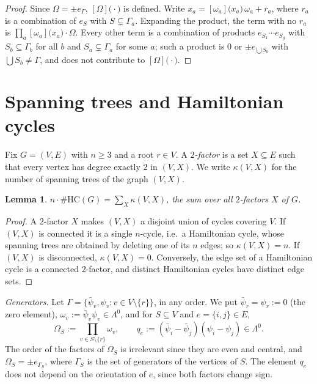 \documentclass[11pt]{amsart}
\theoremstyle{plain}
\newtheorem{lemma}[theorem]{Lemma}
\theoremstyle{definition}
\theoremstyle{remark}
\numberwithin{equation}{section}
\newcommand{\HC}{\#\mathrm{HC}}
\newcommand{\bpsi}{\bar\psi}
\newcommand{\topc}[2]{[#1]\bigl(#2\bigr)}
\begin{document}
\begin{proof}
Since $\Omega=\pm e_\Gamma$, $\topc{\Omega}{\cdot}$ is defined. Write
$x_a=\topc{\omega_a}{x_a}\,\omega_a+r_a$, where $r_a$ is a combination of $e_S$ with
$S\subsetneq\Gamma_a$. Expanding the product, the term with no $r_a$ is
$\prod_a\topc{\omega_a}{x_a}\cdot\Omega$. Every other term is a combination of products
$e_{S_1}\cdots e_{S_g}$ with $S_b\subseteq\Gamma_b$ for all $b$ and $S_a\subsetneq\Gamma_a$ for
some $a$; such a product is $0$ or $\pm e_{\bigcup S_b}$ with $\bigcup S_b\ne\Gamma$, and does not
contribute to $\topc{\Omega}{\cdot}$.
\end{proof}

\section{Spanning trees and Hamiltonian cycles}\label{sec:trees}

Fix $G=(V,E)$ with $n\ge3$ and a root $r\in V$. A \emph{$2$-factor} is a set $X\subseteq E$ such
that every vertex has degree exactly $2$ in $(V,X)$. We write $\kappa(V,X)$ for the number of
spanning trees of the graph $(V,X)$.

\begin{lemma}\label{lem:2factor-trees}
$n\cdot\HC(G)=\sum_{X}\kappa(V,X)$, the sum over all $2$-factors $X$ of $G$.
\end{lemma}

\begin{proof}
A $2$-factor $X$ makes $(V,X)$ a disjoint union of cycles covering $V$. If $(V,X)$ is connected
it is a single $n$-cycle, i.e.\ a Hamiltonian cycle, whose spanning trees are obtained by deleting
one of its $n$ edges; so $\kappa(V,X)=n$. If $(V,X)$ is disconnected, $\kappa(V,X)=0$. Conversely,
the edge set of a Hamiltonian cycle is a connected $2$-factor, and distinct Hamiltonian cycles
have distinct edge sets.
\end{proof}

\emph{Generators.} Let $\Gamma=\{\bpsi_v,\psi_v : v\in V\setminus\{r\}\}$, in any order. We put
$\bpsi_r=\psi_r:=0$ (the zero element), $\omega_v:=\bpsi_v\psi_v\in\Lambda^0$, and for $S\subseteq
V$ and $e=\{i,j\}\in E$,
\[
  \Omega_S:=\prod_{v\in S\setminus\{r\}}\omega_v,\qquad
  q_e:=(\bpsi_i-\bpsi_j)(\psi_i-\psi_j)\in\Lambda^0 .
\]
The order of the factors of $\Omega_S$ is irrelevant since they are even and central, and
$\Omega_S=\pm e_{\Gamma_S}$, where $\Gamma_S$ is the set of generators of the vertices of $S$. The
element $q_e$ does not depend on the orientation of $e$, since both factors change sign.
\end{document}
